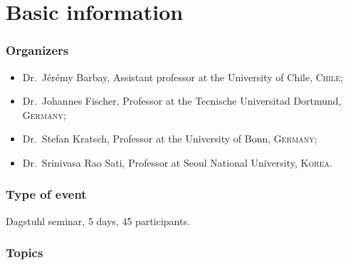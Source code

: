 \documentclass[a4paper,10pt]{article}
\begin{document}


\section{Basic information}

\subsubsection*{ Organizers} 
\begin{itemize}
\item Dr.\ J\'er\'emy Barbay, Assistant professor at the University of Chile, \textsc{Chile};
\item Dr.\ Johannes Fischer, Professor at the Tecnische Universitad Dortmund, \textsc{Germany};
\item Dr.\ Stefan Kratsch,  Professor at the University of Bonn, \textsc{Germany};
\item Dr.\ Srinivasa Rao Sati, Professor at Seoul National  University,  \textsc{Korea}.
\end{itemize}

\subsubsection*{Type of event}
Dagstuhl seminar, 5 days, 45 participants. 


\subsubsection*{Topics}

\end{document}
